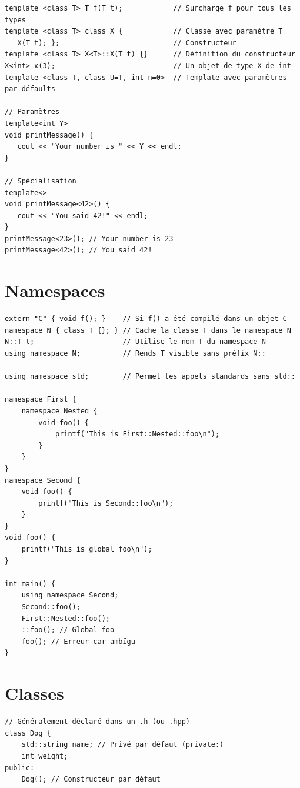 \documentclass{article}
\begin{document}
\begin{multicols*}{3}
\begin{lstlisting}
template <class T> T f(T t);            // Surcharge f pour tous les types
template <class T> class X {            // Classe avec paramètre T
   X(T t); };                           // Constructeur
template <class T> X<T>::X(T t) {}      // Définition du constructeur
X<int> x(3);                            // Un objet de type X de int
template <class T, class U=T, int n=0>  // Template avec paramètres par défaults

// Paramètres
template<int Y>
void printMessage() {
   cout << "Your number is " << Y << endl;
}

// Spécialisation
template<>
void printMessage<42>() {
   cout << "You said 42!" << endl;
}
printMessage<23>(); // Your number is 23
printMessage<42>(); // You said 42!

\end{lstlisting}

    \section*{Namespaces}

    \begin{lstlisting}
extern "C" { void f(); }    // Si f() a été compilé dans un objet C
namespace N { class T {}; } // Cache la classe T dans le namespace N
N::T t;                     // Utilise le nom T du namespace N
using namespace N;          // Rends T visible sans préfix N::

using namespace std;        // Permet les appels standards sans std::

namespace First {
    namespace Nested {
        void foo() {
            printf("This is First::Nested::foo\n");
        }
    }
}
namespace Second {
    void foo() {
        printf("This is Second::foo\n");
    }
}
void foo() {
    printf("This is global foo\n");
}

int main() {
    using namespace Second;
    Second::foo();
    First::Nested::foo();
    ::foo(); // Global foo
    foo(); // Erreur car ambïgu
}
\end{lstlisting}

    \section*{Classes}

    \begin{lstlisting}
// Généralement déclaré dans un .h (ou .hpp)
class Dog {
    std::string name; // Privé par défaut (private:)
    int weight;
public:
    Dog(); // Constructeur par défaut


\end{lstlisting}
\end{multicols*}
\end{document}
